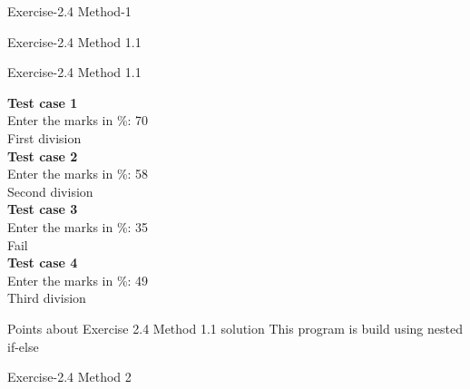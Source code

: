 \documentclass[10pt,a4paper]{beamer}
\begin{document}
\begin{frame}{Exercise-2.4 Method-1}
    
      
\end{frame}

\begin{frame}{Exercise-2.4 Method 1.1}
      
\end{frame} 

\begin{frame}{Exercise-2.4 Method 1.1}
    \begin{minipage}{0.6 \linewidth}
      
    \end{minipage}%
    \begin{minipage}{0.4 \linewidth}
     
     \textbf{Test case 1}
     \\Enter the marks in \%: 70 \\
        First division \\
    \textbf{Test case 2}
     \\Enter the marks in \%: 58 \\
       Second division  \\
    \textbf{Test case 3} 
     \\Enter the marks in \%: 35 \\
        Fail \\    
     \textbf{Test case 4} 
     \\Enter the marks in \%: 49 \\
        Third division \\     
    \end{minipage}
\end{frame}
 \begin{frame}{Points about Exercise 2.4 Method 1.1 solution}
    This program is build using nested if-else
    
 \end{frame}
\begin{frame}{Exercise-2.4 Method 2}
    
      
\end{frame} 
  
\end{document}
